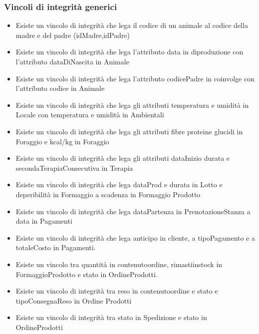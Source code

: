 \documentclass[12pt,a4paper]{article}
\begin{document}
 \subsubsection{Vincoli di integrità generici}
   \begin{itemize}
     \item Esiste un vincolo di integrità che lega il codice di un animale al codice della madre e del padre (idMadre,idPadre)
     \item Esiste un vincolo di integrità che lega l'attributo data in diproduzione con l'attributo dataDiNascita in Animale
     \item Esiste un vincolo di integrità che lega l'attributo codicePadre in coinvolge con l'attributo codice in Animale
     \item Esiste un vincolo di integrità che lega gli attributi temperatura e umidità in Locale con temperatura e umidità in Ambientali
     \item Esiste un vincolo di integrità che lega gli attributi fibre proteine glucidi in Foraggio e kcal/kg in Foraggio
     \item Esiste un vincolo di integrità che lega gli attributi dataInizio durata e secondaTerapiaConsecutiva in Terapia
     \item Esiste un vincolo di integrità che lega dataProd e durata in Lotto e deperibilità in Formaggio a scadenza in Formaggio Prodotto
     \item Esiste un vincolo di integrità che lega dataPartenza in PrenotazioneStanza a data in Pagamenti
     \item Esiste un vincolo di integrità che lega anticipo in cliente, a tipoPagamento e a totaleCosto in Pagamenti.
     \item Esiste un vincolo tra quantità in contenutoordine, rimastiinstock in FormaggioProdotto e stato in OrdineProdotti.
     \item Esiste un vincolo di integrità tra reso in contenutoordine e stato e tipoConsegnaReso in Ordine Prodotti
     \item Esiste un vincolo di integrità tra stato in Spedizione e stato in OrdineProdotti
   \end{itemize}
   
   
   
\end{document}
